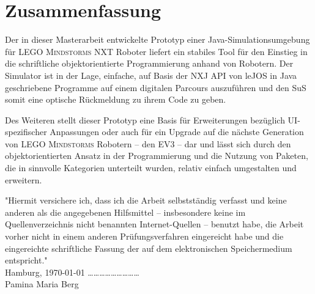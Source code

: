 \documentclass[paper=a4, DIV=calc, BCOR=15mm, twoside=on, onecolumn=on, open = right, titlepage =on, parskip =half, headsepline = on, footsepline = on, chapterprefix = off, appendixprefix = off, fontsize = 12pt, numbers = noenddot, abstract = on]{scrbook}
\begin{document}
\section{Zusammenfassung}

Der in dieser Masterarbeit entwickelte Prototyp einer Java-Simulationsumgebung für \textsc{LEGO Mindstorms} NXT Roboter liefert ein stabiles Tool für den Einstieg in die schriftliche objektorientierte Programmierung anhand von Robotern. Der Simulator ist in der Lage, einfache, auf Basis der NXJ API von leJOS in Java geschriebene Programme auf einem digitalen Parcours auszuführen und den SuS somit eine optische Rückmeldung zu ihrem Code zu geben.

Des Weiteren stellt dieser Prototyp eine Basis für Erweiterungen bezüglich UI-spezifischer Anpassungen oder auch für ein Upgrade auf die nächste Generation von \textsc{LEGO Mindstorms} Robotern -- den EV3 -- dar und lässt sich durch den objektorientierten Ansatz in der Programmierung und die Nutzung von Paketen, die in sinnvolle Kategorien unterteilt wurden, relativ einfach umgestalten und erweitern.


\newpage

\newpage
\thispagestyle{empty}
\vspace*{\fill}
"Hiermit versichere ich, dass ich die Arbeit selbstständig verfasst und keine anderen als die angegebenen Hilfsmittel – insbesondere keine im Quellenverzeichnis nicht benannten Internet-Quellen – benutzt habe, die Arbeit vorher nicht in einem anderen Prüfungsverfahren eingereicht habe und die eingereichte schriftliche Fassung der auf dem elektronischen Speichermedium entspricht."\\

Hamburg, \today \hspace*{\fill} \dots \dots \dots \dots \dots \dots \dots \dots \dots\\
\hspace*{\fill} Pamina Maria Berg $\,$
\end{document}
